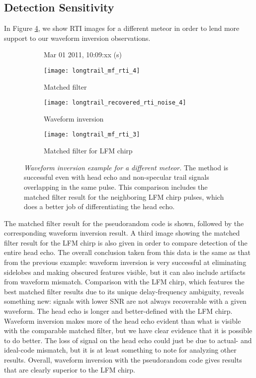 \subsection{Detection Sensitivity}
In Figure \ref{fig:longtrail_recovery_rti_comparison}, we show RTI images for a different meteor in order to lend more support to our waveform inversion observations.
\begin{figure}[tpb]
 \vspace{-1.5\baselineskip}
 \begin{subfigure}{\textwidth}
  \centering
  \textsf{\footnotesize Mar 01 2011, 10:09:xx (s)}
  
  \texttt{[image: longtrail\_mf\_rti\_4]}
  \caption{Matched filter}
  \label{fig:longtrail_mf_rti}
 \end{subfigure}
 
 \vspace{0.5\baselineskip}
 \begin{subfigure}{\textwidth}
  \centering
  \texttt{[image: longtrail\_recovered\_rti\_noise\_4]}
  \caption{Waveform inversion}
  \label{fig:longtrail_recovered_rti}
 \end{subfigure}
 
 \vspace{0.5\baselineskip}
 \begin{subfigure}{\textwidth}
  \centering
  \texttt{[image: longtrail\_mf\_rti\_3]}
  \caption{Matched filter for LFM chirp}
  \label{fig:longtrail_mf_lfm_rti}
 \end{subfigure}
 \caption[Waveform inversion example for a different meteor]{\emph{Waveform inversion example for a different meteor.} The method is successful even with head echo and non-specular trail signals overlapping in the same pulse. This comparison includes the matched filter result for the neighboring LFM chirp pulses, which does a better job of differentiating the head echo.}
 \label{fig:longtrail_recovery_rti_comparison}
\end{figure}%
The matched filter result for the pseudorandom code is shown, followed by the corresponding waveform inversion result. A third image showing the matched filter result for the LFM chirp is also given in order to compare detection of the entire head echo. The overall conclusion taken from this data is the same as that from the previous example: waveform inversion is very successful at eliminating sidelobes and making obscured features visible, but it can also include artifacts from waveform mismatch. Comparison with the LFM chirp, which features the best matched filter results due to its unique delay-frequency ambiguity, reveals something new: signals with lower SNR are not always recoverable with a given waveform. The head echo is longer and better-defined with the LFM chirp. Waveform inversion makes more of the head echo evident than what is visible with the comparable matched filter, but we have clear evidence that it is possible to do better. The loss of signal on the head echo could just be due to actual- and ideal-code mismatch, but it is at least something to note for analyzing other results. Overall, waveform inversion with the pseudorandom code gives results that are clearly superior to the LFM chirp.

